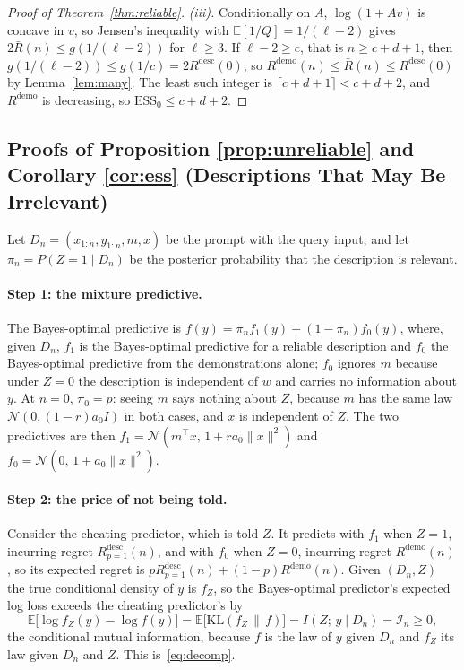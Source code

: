 \documentclass{article}
\newcommand{\ess}{\mathrm{ESS}}
\newcommand{\E}{\mathbb{E}}
\begin{document}
\begin{proof}[Proof of Theorem~\ref{thm:reliable}]
\emph{(iii).} Conditionally on $A$, $\log(1 + Av)$ is concave in $v$, so Jensen's inequality with $\E[1/Q] = 1/(\ell-2)$ gives $2\bar R(n) \le g(1/(\ell-2))$ for $\ell \ge 3$. If $\ell - 2 \ge c$, that is $n \ge c + d + 1$, then $g(1/(\ell-2)) \le g(1/c) = 2R^{\mathrm{desc}}(0)$, so $R^{\mathrm{demo}}(n) \le \bar R(n) \le R^{\mathrm{desc}}(0)$ by Lemma~\ref{lem:many}. The least such integer is $\lceil c + d + 1 \rceil < c + d + 2$, and $R^{\mathrm{demo}}$ is decreasing, so $\ess_0 \le c + d + 2$.
\end{proof}

\subsection{Proofs of Proposition \ref{prop:unreliable} and Corollary \ref{cor:ess} (Descriptions That May Be Irrelevant)}\label{app:reliability}
Let $D_n = (x_{1:n}, y_{1:n}, m, x)$ be the prompt with the query input, and let $\pi_n = P(Z = 1 \mid D_n)$ be the posterior probability that the description is relevant.

\paragraph{Step 1: the mixture predictive.}
The Bayes-optimal predictive is $f(y) = \pi_n f_1(y) + (1 - \pi_n) f_0(y)$, where, given $D_n$, $f_1$ is the Bayes-optimal predictive for a reliable description and $f_0$ the Bayes-optimal predictive from the demonstrations alone; $f_0$ ignores $m$ because under $Z = 0$ the description is independent of $w$ and carries no information about $y$. At $n = 0$, $\pi_0 = p$: seeing $m$ says nothing about $Z$, because $m$ has the same law $\mathcal{N}(0, (1-r) a_0 I)$ in both cases, and $x$ is independent of $Z$. The two predictives are then $f_1 = \mathcal{N}(m^\top x,\, 1 + r a_0\|x\|^2)$ and $f_0 = \mathcal{N}(0,\, 1 + a_0\|x\|^2)$.

\paragraph{Step 2: the price of not being told.}
Consider the cheating predictor, which is told $Z$. It predicts with $f_1$ when $Z=1$, incurring regret $R^{\mathrm{desc}}_{p=1}(n)$, and with $f_0$ when $Z=0$, incurring regret $R^{\mathrm{demo}}(n)$, so its expected regret is $p R^{\mathrm{desc}}_{p=1}(n) + (1-p) R^{\mathrm{demo}}(n)$. Given $(D_n, Z)$ the true conditional density of $y$ is $f_Z$, so the Bayes-optimal predictor's expected log loss exceeds the cheating predictor's by
\[
\E\big[\log f_Z(y) - \log f(y)\big] = \E\big[\mathrm{KL}(f_Z \,\|\, f)\big] = I(Z;\, y \mid D_n) = \mathcal{I}_n \ge 0,
\]
the conditional mutual information, because $f$ is the law of $y$ given $D_n$ and $f_Z$ its law given $D_n$ and $Z$. This is~\eqref{eq:decomp}.
\end{document}
